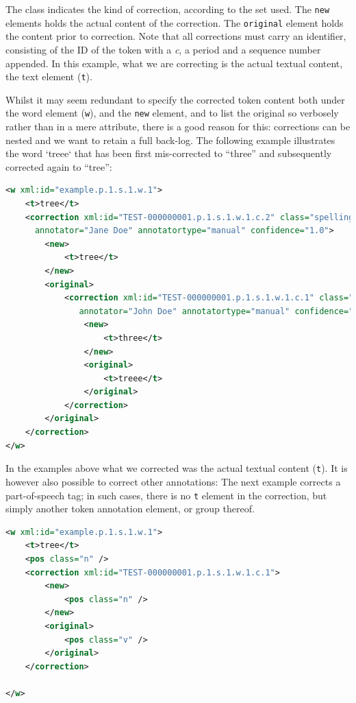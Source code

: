 \documentclass[a4paper,12pt]{report}
\begin{document}
The class indicates the kind of correction, according to the set used. The \texttt{new} elements holds the actual content of the correction. The \texttt{original} element holds the content prior to correction. Note that all corrections must carry an identifier, consisting of the ID of the token with a \emph{c}, a period and a sequence number appended. In this example, what we are correcting is the actual textual content, the text element (\texttt{t}).

Whilst it may seem redundant to specify the corrected token content both under the word element (\texttt{w}), and the \texttt{new} element, and to list the original so verbosely rather than in a mere attribute, there is a good reason for this: corrections can be nested and we want to retain a full back-log. The following example illustrates the word `treee` that has been first mis-corrected to ``three'' and subsequently corrected again to ``tree'':

\begin{lstlisting}[language=xml]
<w xml:id="example.p.1.s.1.w.1">
    <t>tree</t>
    <correction xml:id="TEST-000000001.p.1.s.1.w.1.c.2" class="spelling" 
      annotator="Jane Doe" annotatortype="manual" confidence="1.0">
        <new>
            <t>tree</t>
        </new>
        <original>
            <correction xml:id="TEST-000000001.p.1.s.1.w.1.c.1" class="spelling"
               annotator="John Doe" annotatortype="manual" confidence="0.6">
                <new>
                    <t>three</t>
                </new>
                <original>
                    <t>treee</t>
                </original>
            </correction>
        </original>
    </correction>
</w>
\end{lstlisting}

In the examples above what we corrected was the actual textual content (\texttt{t}). It is however also possible to correct other annotations:
The next example corrects a part-of-speech tag; in such cases, there is no \texttt{t} element in the correction, but simply another token annotation element, or group thereof.

\begin{lstlisting}[language=xml]
<w xml:id="example.p.1.s.1.w.1">
    <t>tree</t>
    <pos class="n" />
    <correction xml:id="TEST-000000001.p.1.s.1.w.1.c.1">
        <new>
            <pos class="n" />
        </new>
        <original>
            <pos class="v" />
        </original>
    </correction>
    
</w>    
\end{lstlisting}
\end{document}
